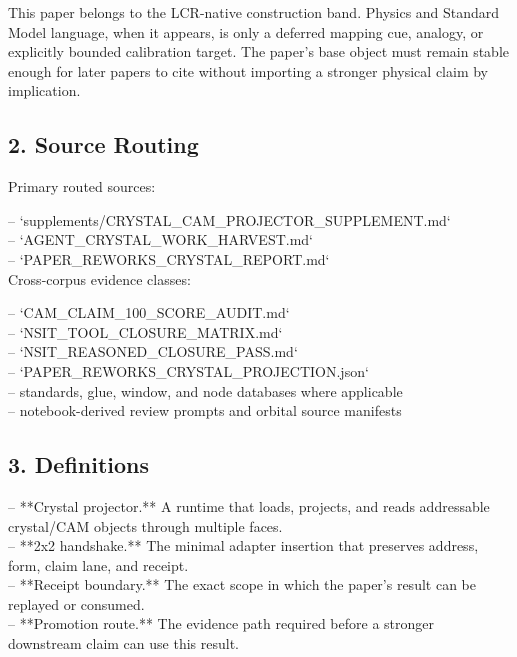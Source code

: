 \documentclass[11pt]{article}
\begin{document}
This paper belongs to the LCR-native construction band. Physics and Standard Model language, when it appears, is only a deferred mapping cue, analogy, or explicitly bounded calibration target. The paper's base object must remain stable enough for later papers to cite without importing a stronger physical claim by implication.

\subsection*{2. Source Routing}

Primary routed sources:

\noindent{}-- `supplements/CRYSTAL\_CAM\_PROJECTOR\_SUPPLEMENT.md`\\
\noindent{}-- `AGENT\_CRYSTAL\_WORK\_HARVEST.md`\\
\noindent{}-- `PAPER\_REWORKS\_CRYSTAL\_REPORT.md`\\

Cross-corpus evidence classes:

\noindent{}-- `CAM\_CLAIM\_100\_SCORE\_AUDIT.md`\\
\noindent{}-- `NSIT\_TOOL\_CLOSURE\_MATRIX.md`\\
\noindent{}-- `NSIT\_REASONED\_CLOSURE\_PASS.md`\\
\noindent{}-- `PAPER\_REWORKS\_CRYSTAL\_PROJECTION.json`\\
\noindent{}-- standards, glue, window, and node databases where applicable\\
\noindent{}-- notebook-derived review prompts and orbital source manifests\\

\subsection*{3. Definitions}

\noindent{}-- **Crystal projector.** A runtime that loads, projects, and reads addressable crystal/CAM objects through multiple faces.\\
\noindent{}-- **2x2 handshake.** The minimal adapter insertion that preserves address, form, claim lane, and receipt.\\
\noindent{}-- **Receipt boundary.** The exact scope in which the paper's result can be replayed or consumed.\\
\noindent{}-- **Promotion route.** The evidence path required before a stronger downstream claim can use this result.\\
\end{document}
